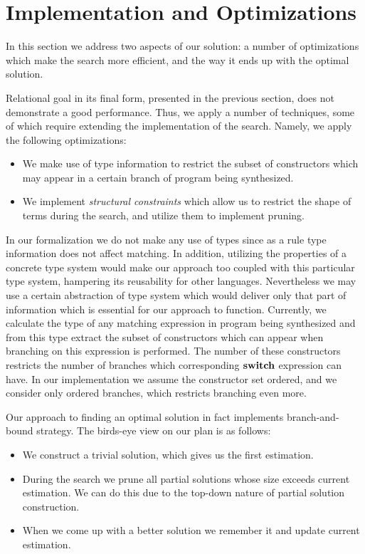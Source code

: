 \section{Implementation and Optimizations}
\label{sec:optimization}

In this section we address two aspects of our solution: a number of optimizations which make the search more efficient, and
the way it ends up with the optimal solution.

Relational goal in its final form, presented in the previous section, does not demonstrate a good performance. Thus, we apply a number
of techniques, some of which require extending the implementation of the search. Namely, we apply the following optimizations:

\begin{itemize}
\item We make use of type information to restrict the subset of constructors which may appear in a certain branch of
  program being synthesized.
\item We implement \emph{structural constraints} which allow us to restrict the shape of terms during the search, and
  utilize them to implement pruning.  
\end{itemize}

In our formalization we do not make any use of types since as a rule type information does not affect matching. In addition,
utilizing the properties of a concrete type system would make our approach too coupled with this particular type system, hampering
its reusability for other languages. Nevertheless we may use a certain abstraction of type system which would deliver only
that part of information which is essential for our approach to function. Currently, we calculate the type of any matching expression in
program being synthesized and from this type extract the subset of constructors which can appear when branching on this expression
is performed. The number of these constructors restricts the number of branches which corresponding $\mathbf{switch}$ expression can have.
In our implementation we assume the constructor set ordered, and we consider only ordered branches, which restricts branching even more.

Our approach to finding an optimal solution in fact implements branch-and-bound strategy. The birds-eye view on our plan is as follows:

\begin{itemize}
\item We construct a trivial solution, which gives us the first estimation.
\item During the search we prune all partial solutions whose size exceeds current estimation. We can do this due to
  the top-down nature of partial solution construction.
\item When we come up with a better solution we remember it and update current estimation.
\end{itemize}

